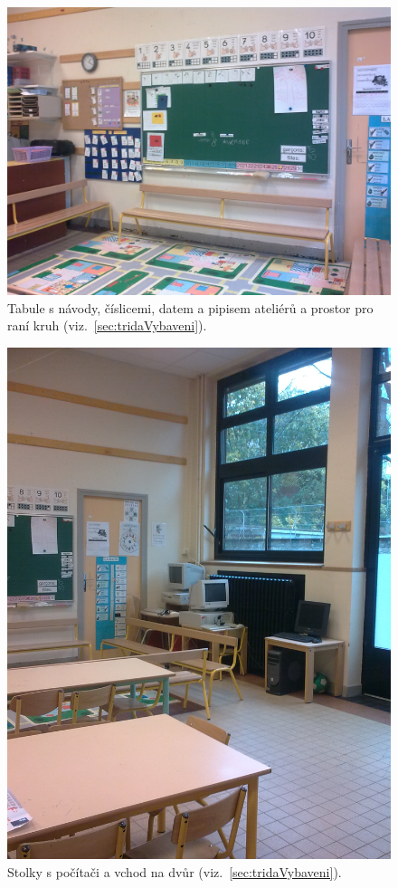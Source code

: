 	\begin{figure}[tb]
		\centering
		\includegraphics[height = 0.35\textheight]{./fotky/Obr1.jpg}
		\caption{
			Tabule s návody, číslicemi, datem a pipisem ateliérů a prostor pro raní kruh (viz.~\ref{sec:tridaVybaveni}).
		}
		\label{Obr1}
	\end{figure}

	\begin{figure}[tb]
		\centering
		\includegraphics[height = 0.35\textheight]{./fotky/Obr2.jpg}
		\caption{
			Stolky s počítači a vchod na dvůr (viz.~\ref{sec:tridaVybaveni}).
		}
		\label{Obr2}
	\end{figure}

